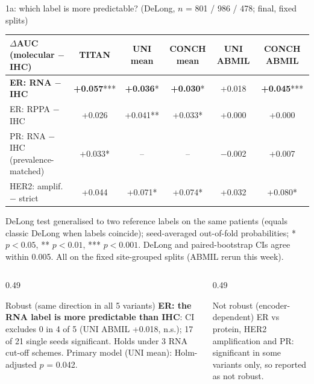\documentclass[aspectratio=169,10pt]{beamer}
\begin{document}
\begin{frame}[t]{1a: which label is more predictable? (DeLong, $n$ = 801 / 986 / 478; final, fixed splits)}
\footnotesize
\centering
\scriptsize
\begin{tabular}{lccccc}
\toprule
$\Delta$AUC (molecular $-$ IHC) & TITAN & UNI mean & CONCH mean & UNI ABMIL & CONCH ABMIL \\
\midrule
\textbf{ER: RNA $-$ IHC} & \textbf{+0.057}*** & \textbf{+0.036}* & \textbf{+0.030}* & +0.018 & \textbf{+0.045}*** \\
ER: RPPA $-$ IHC & +0.026 & +0.041** & +0.033* & +0.000 & +0.000 \\
PR: RNA $-$ IHC (prevalence-matched) & +0.033* & -- & -- & $-$0.002 & +0.007 \\
HER2: amplif. $-$ strict & +0.044 & +0.071* & +0.074* & +0.032 & +0.080* \\
\bottomrule
\end{tabular}

\vspace{2pt}
{\tiny DeLong test generalised to two reference labels on the same patients (equals classic DeLong when labels coincide);
seed-averaged out-of-fold probabilities; * $p<0.05$, ** $p<0.01$, *** $p<0.001$. DeLong and paired-bootstrap CIs agree
within 0.005. All on the fixed site-grouped splits (ABMIL rerun this week).}

\vspace{6pt}
\raggedright
\begin{columns}[T]
\begin{column}{0.49\textwidth}
\begin{block}{Robust (same direction in all 5 variants)}
\textbf{ER: the RNA label is more predictable than IHC}: CI excludes 0 in 4 of 5 (UNI ABMIL +0.018, n.s.);
17 of 21 single seeds significant. Holds under 3 RNA cut-off schemes. Primary model (UNI mean): Holm-adjusted $p$ = 0.042.
\end{block}
\end{column}
\begin{column}{0.49\textwidth}
\begin{alertblock}{Not robust (encoder-dependent)}
ER vs protein, HER2 amplification and PR: significant in some variants only, so reported as not robust.
\end{alertblock}
\end{column}
\end{columns}
\end{frame}
\end{document}
